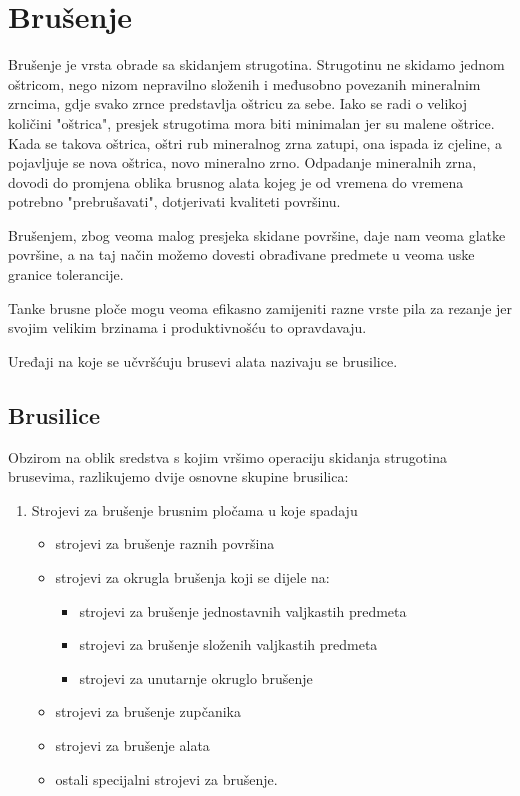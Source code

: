 \documentclass[a4paper,12pt]{article}
\numberwithin{figure}{section}
\begin{document}
\section{Brušenje}
Brušenje je vrsta obrade sa skidanjem strugotina. Strugotinu ne skidamo jednom oštricom, nego nizom nepravilno složenih i međusobno povezanih mineralnim zrncima, gdje svako zrnce predstavlja oštricu za sebe. Iako se radi o velikoj količini "oštrica", presjek strugotima mora biti minimalan jer su malene oštrice. Kada se takova oštrica, oštri rub mineralnog zrna zatupi, ona ispada iz cjeline, a pojavljuje se nova oštrica, novo mineralno zrno. Odpadanje mineralnih zrna, dovodi do promjena oblika brusnog alata kojeg je od vremena do vremena potrebno "prebrušavati", dotjerivati kvaliteti površinu.\par 
Brušenjem, zbog veoma malog presjeka skidane površine, daje nam veoma glatke površine, a na taj način možemo dovesti obrađivane predmete u veoma uske granice tolerancije. \par
Tanke brusne ploče mogu veoma efikasno zamijeniti razne vrste pila za rezanje jer svojim velikim brzinama i produktivnošću to opravdavaju. \par
Uređaji na koje se učvršćuju brusevi alata nazivaju se brusilice.
\subsection{Brusilice}
Obzirom na oblik sredstva s kojim vršimo operaciju skidanja strugotina brusevima, razlikujemo dvije osnovne skupine brusilica:
\begin{enumerate}
\item Strojevi za brušenje brusnim pločama u koje spadaju
\begin{itemize}
\item strojevi za brušenje raznih površina
\item strojevi za okrugla brušenja koji se dijele na:
\begin{itemize}
\item strojevi za brušenje jednostavnih valjkastih predmeta
\item strojevi za brušenje složenih valjkastih predmeta
\item strojevi za unutarnje okruglo brušenje
\end{itemize}
\item strojevi za brušenje zupčanika
\item strojevi za brušenje alata
\item ostali specijalni strojevi za brušenje.
\end{itemize}
\end{enumerate}
\end{document}
